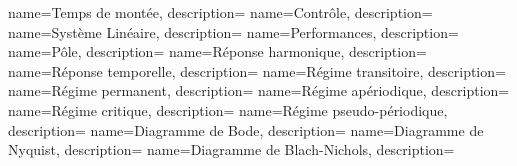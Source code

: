 %
{%
  name={Temps de montée},%
  description={
  }
}
%
{%
  name={Contrôle},%
  description={
  }
}
%
{%
  name={Système Linéaire},%
  description={
  }
}
%
{%
  name={Performances},%
  description={
  }
}
%
{%
  name={Pôle},%
  description={
  }
}
%
{%
  name={Réponse harmonique},%
  description={
  }
}
%
{%
  name={Réponse temporelle},%
  description={
  }
}
%
{%
  name={Régime transitoire},%
  description={
  }
}
%
{%
  name={Régime permanent},%
  description={
  }
}
%
{%
  name={Régime apériodique},%
  description={
  }
}
%
{%
  name={Régime critique},%
  description={
  }
}
%
{%
  name={Régime pseudo-périodique},%
  description={
  }
}
%
{%
  name={Diagramme de Bode},%
  description={
  }
}
%
{%
  name={Diagramme de Nyquist},%
  description={
  }
}
%
{%
  name={Diagramme de Blach-Nichols},%
  description={
  }
}
